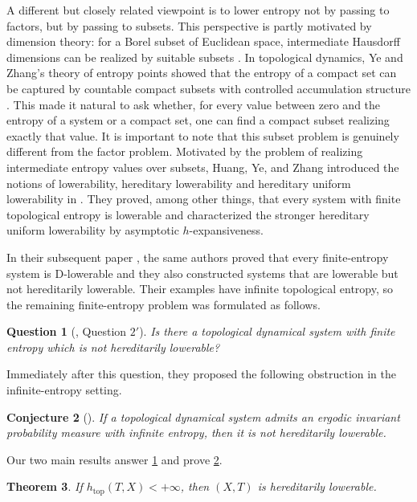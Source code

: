 \documentclass[12pt,letterpaper,reqno]{amsart}
\newcommand{\htop}{h_{\mathrm{top}}}
\newtheorem{theorem}{Theorem}[section]
\newtheorem{question}[theorem]{Question}
\newtheorem{conjecture}[theorem]{Conjecture}
\theoremstyle{definition}
\theoremstyle{remark}
\numberwithin{equation}{section}
\begin{document}
	A different but closely related viewpoint is to lower entropy not by passing to factors, but by passing to subsets. This perspective is partly motivated by dimension theory: for a Borel subset of Euclidean space, intermediate Hausdorff dimensions can be realized by suitable subsets \cite{Falconer1990,Mattila1995}. In topological dynamics, Ye and Zhang's theory of entropy points showed that the entropy of a compact set can be captured by countable compact subsets with controlled accumulation structure \cite{YeZhang2007}. This made it natural to ask whether, for every value between zero and the entropy of a system or a compact set, one can find a compact subset realizing exactly that value. It is important to note that this subset problem is genuinely different from the factor problem.
	Motivated by the problem of realizing intermediate entropy values over subsets, Huang, Ye, and Zhang introduced the notions of lowerability, hereditary lowerability and hereditary uniform lowerability in \cite{HYZ2010}. They proved, among other things, that every system with finite topological entropy is lowerable and characterized the stronger hereditary uniform lowerability by asymptotic $h$-expansiveness.
	
	In their subsequent paper \cite{HYZ2014}, the same authors proved that every  finite-entropy system is D-lowerable and they also constructed systems that are lowerable but not hereditarily lowerable. Their examples have infinite topological entropy, so the remaining finite-entropy problem was formulated as follows.

	
	\begin{question}[{\cite[p.~4430]{HYZ2014}, Question $2'$}]
		\label{ques:finite}
		Is there a topological dynamical system with finite entropy which is not
		hereditarily lowerable?
	\end{question}
	
	Immediately after this question, they proposed the following obstruction in
	the infinite-entropy setting.
	
	\begin{conjecture}[{\cite[p.~4430]{HYZ2014}}]
		\label{conj:infinite}
		If a topological dynamical system admits an ergodic invariant probability
		measure with infinite entropy, then it is not hereditarily lowerable.
	\end{conjecture}
	
	Our two main results answer \cref{ques:finite} and prove
	\cref{conj:infinite}.
	
	\begin{theorem}
		\label{thm:finite-main}
		If $\htop(T,X)<+\infty$, then $(X,T)$ is hereditarily lowerable.
	\end{theorem}
	
\end{document}
